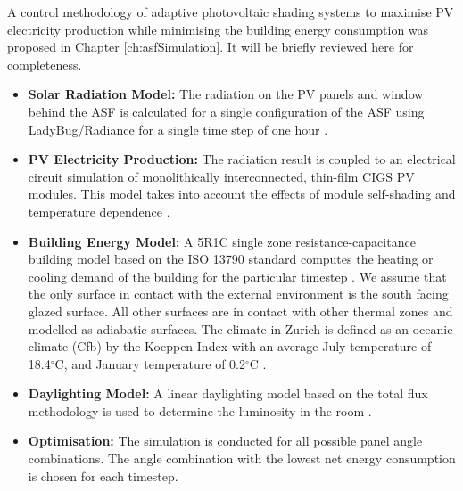 
A control methodology of adaptive photovoltaic shading systems to maximise PV electricity production while minimising the building energy consumption was proposed in Chapter \ref{ch:asfSimulation}. It will be briefly reviewed here for completeness.

\begin{itemize}
\item \textbf{Solar Radiation Model:} The radiation on the PV panels and window behind the ASF is calculated for a single configuration of the ASF using LadyBug/Radiance for a single time step of one hour \cite{roudsari2013ladybug,ward1994radiance}.
\item \textbf{PV Electricity Production:} The radiation result is coupled to an electrical circuit simulation of monolithically interconnected, thin-film CIGS PV modules. This model takes into account the effects of module self-shading and temperature dependence \cite{hofer2016parametric}.
\item \textbf{Building Energy Model:} A 5R1C single zone resistance-capacitance building model based on the ISO 13790 standard computes the heating or cooling demand of the building for the particular timestep \cite{de2008iso}. We assume that the only surface in contact with the external environment is the south facing glazed surface. All other surfaces are in contact with other thermal zones and modelled as adiabatic surfaces. The climate in Zurich is defined as an oceanic climate (Cfb) by the Koeppen Index with an average July temperature of 18.4$^{\circ}$C, and January temperature of 0.2$^{\circ}$C \cite{koppenZurich}.
\item \textbf{Daylighting Model:} A linear daylighting model based on the total flux methodology is used to determine the luminosity in the room \cite{szokolay1980handbook}. 
\item \textbf{Optimisation:} The simulation is conducted for all possible panel angle combinations. The angle combination with the lowest net energy consumption is chosen for each timestep.
\end{itemize}




